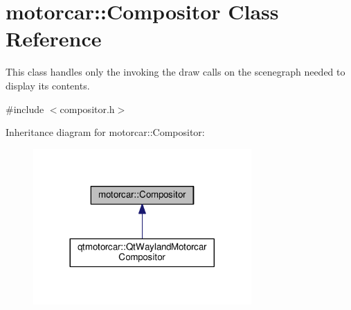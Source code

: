 \hypertarget{classmotorcar_1_1Compositor}{\section{motorcar\-:\-:Compositor Class Reference}
\label{classmotorcar_1_1Compositor}
}


This class handles only the invoking the draw calls on the scenegraph needed to display its contents.  




{\ttfamily \#include $<$compositor.\-h$>$}



Inheritance diagram for motorcar\-:\-:Compositor\-:
\nopagebreak
\begin{figure}[H]
\begin{center}
\leavevmode
\includegraphics[width=236pt]{classmotorcar_1_1Compositor__inherit__graph}
\end{center}
\end{figure}
